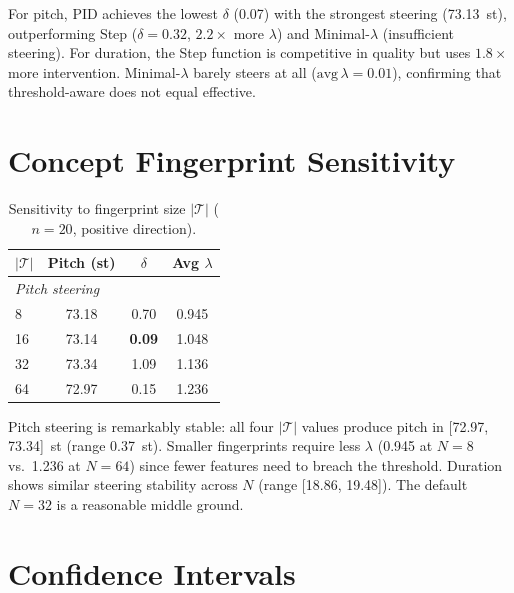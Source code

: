 \documentclass{article}
\theoremstyle{plain}
\begin{document}
For pitch, PID achieves the lowest $\delta$ (0.07) with the strongest steering (73.13~st), outperforming Step ($\delta{=}0.32$, $2.2{\times}$ more $\lambda$) and Minimal-$\lambda$ (insufficient steering). For duration, the Step function is competitive in quality but uses $1.8{\times}$ more intervention. Minimal-$\lambda$ barely steers at all ($\text{avg}\,\lambda{=}0.01$), confirming that threshold-aware does not equal effective.

\section{Concept Fingerprint Sensitivity}
\label{app:fingerprint}

\begin{table}[h]
  \caption{Sensitivity to fingerprint size $|\mathcal{T}|$ ($n{=}20$, positive direction).}
  \label{tab:fingerprint}
  \begin{center}
  \begin{small}
  \begin{tabular}{lccc}
    \toprule
    $|\mathcal{T}|$ & Pitch (st) & $\delta$ & Avg $\lambda$ \\
    \midrule
    \multicolumn{4}{l}{\textit{Pitch steering}} \\
    8 & 73.18 & 0.70 & 0.945 \\
    16 & 73.14 & \textbf{0.09} & 1.048 \\
    32 & 73.34 & 1.09 & 1.136 \\
    64 & 72.97 & 0.15 & 1.236 \\
    \bottomrule
  \end{tabular}
  \end{small}
  \end{center}
\end{table}

Pitch steering is remarkably stable: all four $|\mathcal{T}|$ values produce pitch in [72.97, 73.34]~st (range 0.37~st). Smaller fingerprints require less $\lambda$ (0.945 at $N{=}8$ vs.\ 1.236 at $N{=}64$) since fewer features need to breach the threshold. Duration shows similar steering stability across $N$ (range [18.86, 19.48]). The default $N{=}32$ is a reasonable middle ground.

\section{Confidence Intervals}
\label{app:confidence_intervals}
\end{document}
